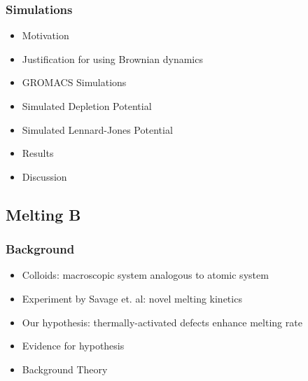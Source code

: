 \documentclass[11pt]{article}
\begin{document}
\subsubsection{Simulations}
\label{sec-1_1_3}
\begin{itemize}

\item Motivation\\
\label{sec-1_1_3_1}%
\item Justification for using Brownian dynamics\\
\label{sec-1_1_3_2}%
\item GROMACS Simulations\\
\label{sec-1_1_3_3}%
\item Simulated Depletion Potential\\
\label{sec-1_1_3_4}%
\item Simulated Lennard-Jones Potential\\
\label{sec-1_1_3_5}%
\item Results\\
\label{sec-1_1_3_6}%
\item Discussion\\
\label{sec-1_1_3_7}%
\end{itemize} %
\subsection{Melting B}
\label{sec-1_2}
\subsubsection{Background}
\label{sec-1_2_1}
\begin{itemize}

\item Colloids: macroscopic system analogous to atomic system\\
\label{sec-1_2_1_1}%
\item Experiment by Savage et. al: novel melting kinetics\\
\label{sec-1_2_1_2}%
\item Our hypothesis:  thermally-activated defects enhance melting rate\\
\label{sec-1_2_1_3}%
\item Evidence for hypothesis\\
\label{sec-1_2_1_4}%
\item Background Theory\\
\label{sec-1_2_1_5}%
\end{itemize} %
\end{document}
